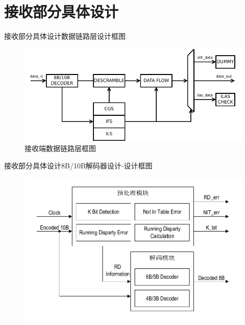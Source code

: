 \documentclass{beamer}
\begin{document}
\section{接收部分具体设计}

\begin{frame}{接收部分具体设计}{数据链路层设计框图}
  \begin{figure}
  \centering
  \includegraphics[scale=0.7]{./img/recv_link_layer_top.pdf}
  \caption{接收端数据链路层框图}
  \end{figure}
\end{frame}

\begin{frame}{接收部分具体设计}{8B/10B解码器设计-设计框图}
  \begin{figure}
  \centering
  \includegraphics[scale=0.6]{./img/8b10b_decoder_diagram.pdf}
  \end{figure}
\end{frame}
\end{document}
